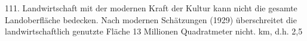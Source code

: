 \documentclass[11pt,a4paper]{book}
\begin{document}
111. Landwirtschaft mit der modernen Kraft der Kultur kann nicht die gesamte Landoberfläche bedecken. Nach modernen Schätzungen (1929) überschreitet die landwirtschaftlich genutzte Fläche 13 Millionen Quadratmeter nicht. km, d.h. 2,5%
\end{document}
